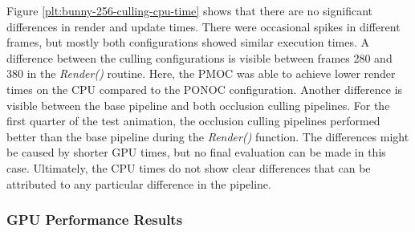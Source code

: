 \noindent
Figure \ref{plt:bunny-256-culling-cpu-time} shows that there are no significant differences in render and update times.
There were occasional spikes in different frames, but mostly both configurations showed similar execution times. A 
difference between the culling configurations is visible between frames 280 and 380 in the \emph{Render()} routine. 
Here, the \ac{PMOC} was able to achieve lower render times on the \ac{CPU} compared to the \ac{PONOC} configuration. 
Another difference is visible between the base pipeline and both occlusion culling pipelines. For the first quarter 
of the test animation, the occlusion culling pipelines performed better than the base pipeline during the \emph{Render()} 
function. The differences might be caused by shorter \ac{GPU} times, but no final evaluation can be made in this case. 
Ultimately, the \ac{CPU} times do not show clear differences that can be attributed to any particular difference in 
the pipeline.
\enlargethispage{\baselineskip}

\subsubsection*{GPU Performance Results} \label{subsubsec-gpu-performance-results-bunny}

